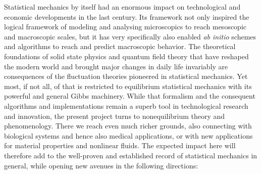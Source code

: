Statistical mechanics by itself had an enormous impact on technological and economic
developments in the last century. Its framework not only inspired the logical framework
of modeling and analysing microscopics to reach mesoscopic and macroscopic scales, but it
has very specifically also enabled {\it ab initio} schemes and algorithms to reach and predict
macroscopic behavior.
%
The theoretical foundations of solid state physics and quantum field theory that have reshaped the
modern world and brought major changes in daily life invariably are consequences of the
fluctuation theories pioneered in statistical mechanics. Yet most, if not all, of that is
restricted to equilibrium statistical mechanics with its powerful and general Gibbs
machinery.
%
While that formalism and the consequent algorithms and implementations remain a superb tool
in technological research and innovation, the present project turns to nonequilibrium theory
and phenomenology. There we reach even much richer grounds, also connecting with biological
systems and hence also medical applications, or with new applications for material properties and nonlinear fluids. The expected impact here will therefore add to
the well-proven and established record of statistical mechanics in general, while opening
new avenues in the following directions:
